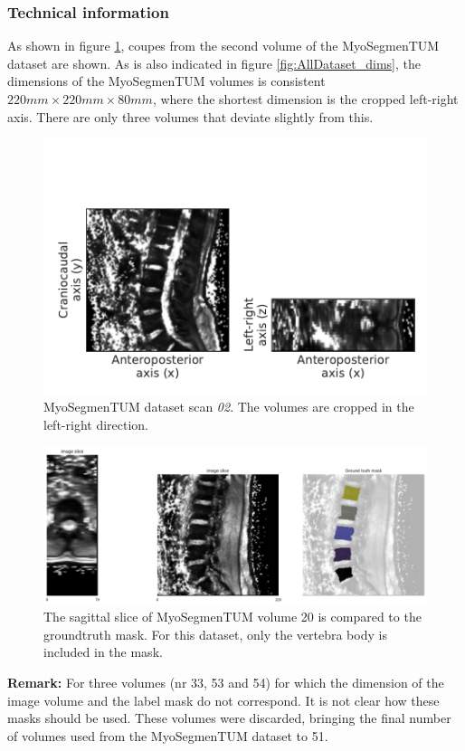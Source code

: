 \subsubsection{Technical information}

As shown in figure \ref{fig:OSF_02}, coupes from the second volume of the MyoSegmenTUM dataset are shown.
As is also indicated in figure \ref{fig:AllDataset_dims}, the dimensions of the MyoSegmenTUM volumes is consistent $220 mm \times 220 mm \times 80 mm$, where the shortest dimension is the cropped left-right axis.
There are only three volumes that deviate slightly from this.

\begin{figure}
    \centering
    \includegraphics[width=.95\textwidth]{automated_graphs/OSF_02.pdf}
    \caption{MyoSegmenTUM dataset scan \textit{02}. 
    The volumes are cropped in the left-right direction. 
    \label{fig:OSF_02}}
\end{figure}

\begin{figure}
    \centering
    \includegraphics[width=.95\textwidth]{images/MyoSegmenTUM020_s21_mask.pdf}
    \caption{The sagittal slice of MyoSegmenTUM volume 20 is compared to the \Gls{groundtruth} mask.
    For this dataset, only the vertebra body is included in the mask. 
    \protect
    }
\end{figure}

\textbf{Remark:} For three volumes (nr 33, 53 and 54) for which the dimension of the image volume and the label mask do not correspond. 
It is not clear how these masks should be used. 
These volumes were discarded, bringing the final number of volumes used from the MyoSegmenTUM dataset to 51.